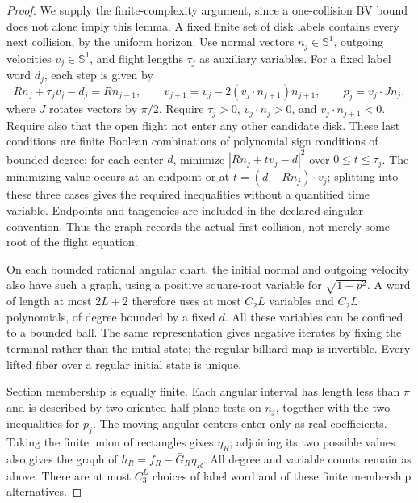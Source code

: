 \begin{proof}
We supply the finite-complexity argument, since a one-collision BV
bound does not alone imply this lemma. A fixed finite set of disk
labels contains every next collision, by the uniform horizon. Use
normal vectors $n_j\in\mathbb S^1$, outgoing velocities
$v_j\in\mathbb S^1$, and flight lengths $\tau_j$ as auxiliary
variables. For a fixed label word $d_j$, each step is given by
\begin{equation}\label{eq:polynomial-flight-graph}
 Rn_j+\tau_jv_j-d_j=Rn_{j+1},\qquad
 v_{j+1}=v_j-2(v_j\cdot n_{j+1})n_{j+1},\qquad
 p_j=v_j\cdot Jn_j,
\end{equation}
where $J$ rotates vectors by $\pi/2$. Require $\tau_j>0$,
$v_j\cdot n_j>0$, and $v_j\cdot n_{j+1}<0$.
Require also that the open flight not enter any other candidate disk.
These last conditions are finite Boolean combinations of polynomial
sign conditions of bounded degree: for each center $d$, minimize
$|Rn_j+t v_j-d|^2$ over $0\le t\le\tau_j$.
The minimizing value occurs at an endpoint or at
$t=(d-Rn_j)\cdot v_j$; splitting into these three cases gives the
required inequalities without a quantified time variable. Endpoints
and tangencies are included in the declared singular convention.
Thus the graph records the actual first collision, not merely some
root of the flight equation.

On each bounded rational angular chart, the initial normal and outgoing
velocity also have such a graph, using a positive square-root variable
for $\sqrt{1-p^2}$. A word of length at most $2L+2$ therefore uses
at most $C_2L$ variables and $C_2L$ polynomials, of degree bounded by
a fixed $d$. All these variables can be confined to a bounded ball.
The same representation gives negative iterates by fixing the terminal
rather than the initial state; the regular billiard map is invertible.
Every lifted fiber over a regular initial state is unique.

Section membership is equally finite. Each angular interval has length
less than $\pi$ and is described by two oriented half-plane tests on
$n_j$, together with the two inequalities for $p_j$. The moving angular
centers enter only as real coefficients. Taking the finite union of
rectangles gives $\eta_R$; adjoining its two possible values also gives
the graph of $h_R=f_R-\bar G_R\eta_R$. All degree and variable counts
remain as above. There are at most $C_3^L$ choices of label word and
of these finite membership alternatives.


\end{proof}
